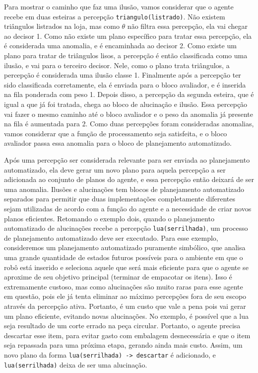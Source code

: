 \begin{example}
    Para mostrar o caminho que faz uma ilusão, vamos considerar que o agente recebe em duas esteiras a percepção \texttt{triangulo(listrado)}. Não existem triângulos listrados na loja, mas como $\theta$ não filtra essa percepção, ela vai chegar ao decisor 1. Como não existe um plano específico para tratar essa percepção, ela é considerada uma anomalia, e é encaminhada ao decisor 2. Como existe um plano para tratar de triângulos lisos, a percepção é então classificada como uma ilusão, e vai para o terceiro decisor. Nele, como o plano trata triângulos, a percepção é considerada uma ilusão classe 1. Finalmente após a percepção ter sido classificada corretamente, ela é enviada para o bloco avaliador, e é inserida na fila ponderada com peso 1. Depois disso, a percepção da segunda esteira, que é igual a que já foi tratada, chega ao bloco de alucinação e ilusão. Essa percepção vai fazer o mesmo caminho até o bloco avaliador e o peso da anomalia já presente na fila é aumentada para 2. Como duas percepções foram consideradas anomalias, vamos considerar que a função de processamento seja satisfeita, e o bloco avaliador passa essa anomalia para o bloco de planejamento automatizado.
    
    Após uma percepção ser considerada relevante para ser enviada ao planejamento automatizado, ela deve gerar um novo plano para aquela percepção a ser adicionada ao conjunto de planos do agente, e essa percepção então deixará de ser uma anomalia. Ilusões e alucinações tem blocos de planejamento automatizado separados para permitir que duas implementações completamente diferentes sejam utilizadas de acordo com a função do agente e a necessidade de criar novos planos eficientes. Retomando o exemplo dois, quando o planejamento automatizado de alucinações recebe a percepção \texttt{lua(serrilhada)}, um processo de planejamento automatizado deve ser executado. Para esse exemplo, consideremos um planejamento automatizado puramente simbólico, que analisa uma grande quantidade de estados futuros possíveis para o ambiente em que o robô está inserido e seleciona aquele que será mais eficiente para que o agente se aproxime de seu objetivo principal (terminar de empacotar os itens). Isso é extremamente custoso, mas como alucinações são muito raras para esse agente em questão, pois ele já tenta eliminar ao máximo percepções fora de seu escopo através da percepção ativa. Portanto, é um custo que vale a pena pois vai gerar um plano eficiente, evitando novas alucinações. No exemplo, é possível que a lua seja resultado de um corte errado na peça circular. Portanto, o agente precisa descartar esse item, para evitar gasto com embalagem desnecessária e que o item seja repassada para uma próxima etapa, gerando ainda mais custo. Assim, um novo plano da forma \texttt{lua(serrilhada) -> descartar} é adicionado, e \texttt{lua(serrilhada)} deixa de ser uma alucinação.


\end{example}
